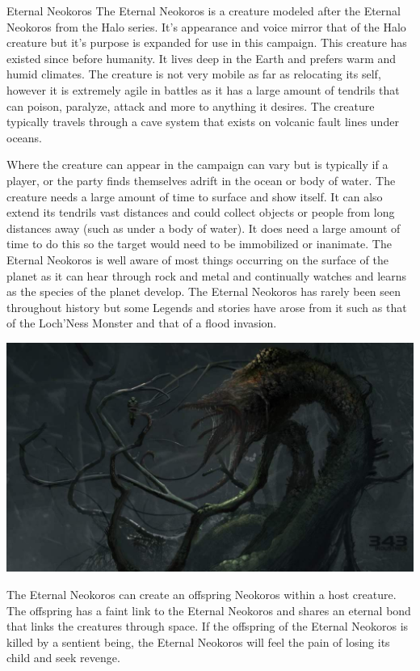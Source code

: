 \begin{commentbox}{Eternal Neokoros}	
	The Eternal Neokoros is a creature modeled after the Eternal Neokoros from the Halo series. It's appearance and voice mirror that of the Halo creature but it's purpose is expanded for use in this campaign. This creature has existed since before humanity. It lives deep in the Earth and prefers warm and humid climates. The creature is not very mobile as far as relocating its self, however it is extremely agile in battles as it has a large amount of tendrils that can poison, paralyze, attack and more to anything it desires. The creature typically travels through a cave system that exists on volcanic fault lines under oceans. 
	
	Where the creature can appear in the campaign can vary but is typically if a player, or the party finds themselves adrift in the ocean or body of water. The creature needs a large amount of time to surface and show itself. It can also extend its tendrils vast distances and could collect objects or people from long distances away (such as under a body of water). It does need a large amount of time to do this so the target would need to be immobilized or inanimate. The Eternal Neokoros is well aware of most things occurring on the surface of the planet as it can hear through rock and metal and continually watches and learns as the species of the planet develop. The Eternal Neokoros has rarely been seen throughout history but some Legends and stories have arose from it such as that of the Loch'Ness Monster and that of a flood invasion.
	
	\begin{center}
		\includegraphics[width=0.95\linewidth]{img/Halo/gravemind.jpg}
	\end{center}

	The Eternal Neokoros can create an offspring Neokoros within a host creature. The offspring has a faint link to the Eternal Neokoros and shares an eternal bond that links the creatures through space. If the offspring of the Eternal Neokoros is killed by a sentient being, the Eternal Neokoros will feel the pain of losing its child and seek revenge.
\end{commentbox}

